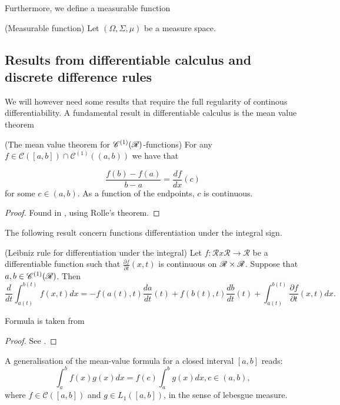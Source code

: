 \begin{definition}
\begin{definition}
Furthermore, we define a measurable function

\begin{definition}(Measurable function)
	Let $(\Omega, \Sigma, \mu)$ be a measure space. 
\end{definition}



\subsection{Results from differentiable calculus and discrete difference rules}
We will however need some results that require the full regularity of continous differentiability. A fundamental result in differentiable calculus is the mean value theorem

\begin{theorem}(The mean value theorem for $\mathscr{C}^{(1)}(\mathscr{R})$-functions)
	For any $f \in \mathscr{C}([a,b]) \cap \mathscr{C}^{(1)}((a,b))$ we have that 
	
	\begin{equation} \label{MVT}
		\frac{f(b) - f(a)}{b-a} = \frac{df}{dx}(c)
	\end{equation}
	for some $c \in (a,b)$. As a function of the endpoints, $c$ is continuous. 
\end{theorem}
\begin{proof}
	Found in \cite[p.142]{finney2000calculus}, using Rolle's theorem. 
\end{proof}


The following result concern functions  differentiation under the integral sign. 

\begin{theorem}(Leibniz rule for differentiation under the integral)
	Let  $f:\mathscr{R} x \mathscr{R} \rightarrow \mathscr{R}$ be a differentiable function such that $\frac{\partial f}{\partial t}(x,t)$
	is continuous on $\mathscr{R}\times\mathscr{R}$. Suppose that $a, b \in \mathscr{C}^{(1)}(\mathscr{R})$. Then
	\begin{equation} \label{LeibRule}
		\frac{d}{dt}\int_{a(t)}^{b(t)} f(x,t) dx = - f(a(t),t) \frac{da}{dt}(t) + f(b(t),t) \frac{db}{dt}(t) + \int_{a(t)}^{b(t)}\frac{\partial f}{\partial t}(x,t) dx. 
	\end{equation}
\end{theorem}
Formula is taken from 
\begin{proof}
	See \cite[p.255]{kaplan1912advanced}. 
\end{proof}


A generalisation of the mean-value formula for a closed interval $[a,b]$ reads:
\begin{equation}\label{genMVT}
	\int_a^bf(x)g(x)dx = f(c) \int_a^b g(x) dx, c \in (a,b), 
\end{equation}
where $f \in \mathscr{C}([a,b])$ and $g \in L_1([a,b])$, in the sense of lebesgue measure. 


\end{definition}
\end{definition}
